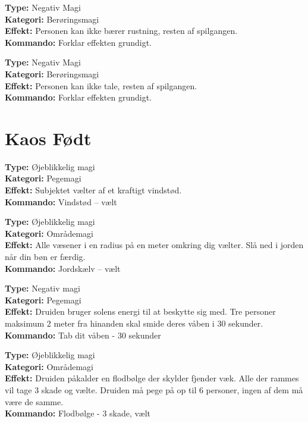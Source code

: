 \begin{jord*}
\textbf{Type:} Negativ Magi\\
\textbf{Kategori:} Berøringsmagi\\
\textbf{Effekt:} Personen kan ikke bærer rustning, resten af spilgangen.\\
\textbf{Kommando:} Forklar effekten grundigt.
\end{jord*}

\begin{jord*}
\textbf{Type:} Negativ Magi\\
\textbf{Kategori:} Berøringsmagi\\
\textbf{Effekt:} Personen kan ikke tale, resten af spilgangen.\\
\textbf{Kommando:} Forklar effekten grundigt.
\end{jord*}

\newpage
\section{Kaos Født}
\begin{nkaos*}[Vindstød]
\textbf{Type:} Øjeblikkelig magi\\ 
\textbf{Kategori:} Pegemagi\\
\textbf{Effekt:} Subjektet vælter af et kraftigt vindstød.\\
\textbf{Kommando:} Vindstød – vælt
\end{nkaos*}

\begin{nkaos*}[Jordskælv]
\textbf{Type:} Øjeblikkelig magi\\ 
\textbf{Kategori:} Områdemagi\\
\textbf{Effekt:} Alle væsener i en radius på en meter omkring dig vælter. Slå ned i jorden når din bøn er færdig.\\
\textbf{Kommando:} Jordskælv – vælt

\end{nkaos*}

\begin{nkaos*}
\textbf{Type:} Negativ magi\\
\textbf{Kategori:} Pegemagi\\
\textbf{Effekt:} Druiden bruger solens energi til at beskytte sig med. Tre personer maksimum 2 meter fra hinanden skal smide deres våben i 30 sekunder.\\
\textbf{Kommando:} Tab dit våben - 30 sekunder

\end{nkaos*}

\begin{nkaos*}[Flodbølge]
\textbf{Type:} Øjeblikkelig magi\\
\textbf{Kategori:} Områdemagi\\
\textbf{Effekt:} Druiden påkalder en flodbølge der skylder fjender væk. Alle der rammes vil tage 3 skade og vælte. Druiden må pege på op til 6 personer, ingen af dem må være de samme.\\
\textbf{Kommando:} Flodbølge - 3 skade, vælt
\end{nkaos*}
